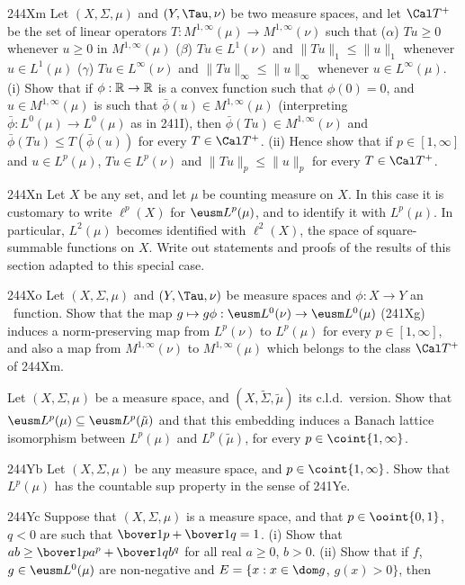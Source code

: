 {\spheader 244Xm Let $(X,\Sigma,\mu)$ and $(Y,\Tau,\nu)$ be two measure
spaces, and let $\Cal T^+$ be the set of linear operators
$T:M^{1,\infty}(\mu)\to M^{1,\infty}(\nu)$ such that ($\alpha$)
$Tu\ge 0$
whenever $u\ge 0$ in $M^{1,\infty}(\mu)$ ($\beta$) $Tu\in L^1(\nu)$ and
$\|Tu\|_1\le\|u\|_1$ whenever $u\in L^1(\mu)$ ($\gamma$)
$Tu\in L^{\infty}(\nu)$ and $\|Tu\|_{\infty}\le\|u\|_{\infty}$ whenever
$u\in L^{\infty}(\mu)$.   (i) Show that if $\phi:\Bbb R\to\Bbb R$ is a
convex function such that $\phi(0)=0$, and $u\in M^{1,\infty}(\mu)$ is
such that $\bar\phi(u)\in M^{1,\infty}(\mu)$ (interpreting
$\bar\phi:L^0(\mu)\to L^0(\mu)$ as in 241I), then
$\bar\phi(Tu)\in M^{1,\infty}(\nu)$ and $\bar\phi(Tu)\le T(\bar\phi(u))$
for every $T\in\Cal T^+$.   (ii) Hence show that if $p\in[1,\infty]$ and
$u\in L^p(\mu)$, $Tu\in L^p(\nu)$ and $\|Tu\|_p\le\|u\|_p$ for every
$T\in\Cal T^+$.

\sqheader 244Xn Let $X$ be any set, and let $\mu$ be counting measure on
$X$.   In this case it is customary to
write $\ell^p(X)$ for ${\eusm L}^p(\mu)$, and to identify it with
$L^p(\mu)$.  In particular, $L^2(\mu)$ becomes identified with
$\ell^2(X)$, the
space of square-summable functions on $X$.   Write out statements
and proofs of the results of this section adapted to this special case.

\spheader 244Xo Let $(X,\Sigma,\mu)$ and $(Y,\Tau,\nu)$ be measure
spaces and $\phi:X\to Y$ an \imp\ function.   Show that the map
$g\mapsto g\phi:\eusm L^0(\nu)\to\eusm L^0(\mu)$ (241Xg) induces a
norm-preserving map from $L^p(\nu)$ to $L^p(\mu)$ for every
$p\in[1,\infty]$, and also a map from $M^{1,\infty}(\nu)$ to
$M^{1,\infty}(\mu)$ which belongs to the class $\Cal T^+$ of 244Xm.

Let $(X,\Sigma,\mu)$ be a measure space, and
$(X,\tilde\Sigma,\tilde\mu)$ its c.l.d.\ version.   Show that
$\eusm L^p(\mu)\subseteq\eusm L^p(\tilde\mu)$ and that this embedding
induces a Banach lattice
isomorphism between $L^p(\mu)$ and $L^p(\tilde\mu)$, for every
$p\in\coint{1,\infty}$.

\spheader 244Yb Let $(X,\Sigma,\mu)$ be any measure space, and
$p\in\coint{1,\infty}$.   Show that $L^p(\mu)$ has the countable sup
property in the sense of 241Ye.   

\spheader 244Yc Suppose that $(X,\Sigma,\mu)$ is a measure
space, and
that $p\in\ooint{0,1}$, $q<0$ are such that $\bover1p+\bover1q=1$.
(i) Show that
$ab\ge\bover1pa^p+\bover1qb^q$ for all real $a\ge 0$, $b>0$.
(ii) Show that if $f$, $g\in\eusm L^0(\mu)$ are non-negative and
$E=\{x:x\in\dom g$, $g(x)>0\}$, then

}
